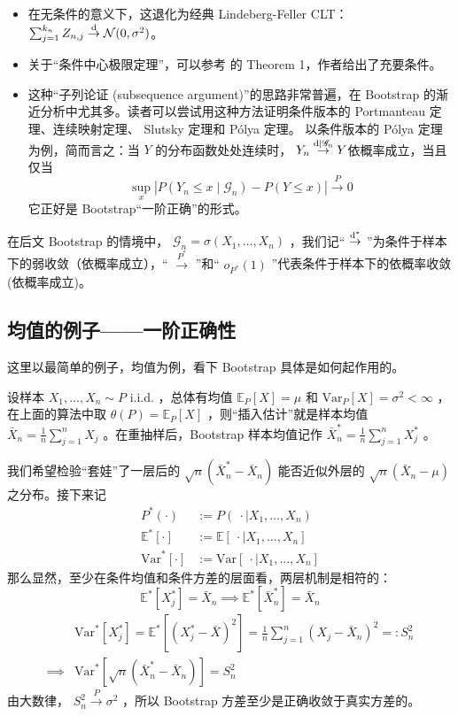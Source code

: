\begin{remark}

\begin{itemize}
\tightlist
\item
  在无条件的意义下，这退化为经典 Lindeberg-Feller CLT： $\sum_{j=1}^{k_n} Z_{n,j} \overset{\rm d}\to \mathcal{N}(0, \sigma^2)$。
\item
  关于``条件中心极限定理''，可以参考 \cite{bulinski2016} 的 Theorem 1，作者给出了充要条件。
\item
  这种``子列论证 (subsequence argument)''的思路非常普遍，在 Bootstrap 的渐近分析中尤其多。读者可以尝试用这种方法证明条件版本的 Portmanteau 定理、连续映射定理、 Slutsky 定理和 Pólya 定理。 以条件版本的 Pólya 定理为例，简而言之：当 $Y$ 的分布函数处处连续时， $Y_n\overset{\rm d|\mathscr G_n}\to Y$依概率成立，当且仅当 
  $$\sup_x|P(Y_n\le x\mid \mathscr G_n)-P(Y\le x)|\overset P\to 0$$ 
  它正好是 Bootstrap``一阶正确''的形式。
\end{itemize}
\end{remark}

在后文 Bootstrap 的情境中， $\mathscr G_n=\sigma(X_1,\dots,X_n)$ ，我们记`` $\overset{\rm d^*}\to$ ''为条件于样本下的弱收敛（依概率成立），`` $\overset{P^*}\to$ ''和`` $o_{P^*}(1)$ ''代表条件于样本下的依概率收敛 (依概率成立)。

\subsection{均值的例子------一阶正确性}

这里以最简单的例子，均值为例，看下 Bootstrap 具体是如何起作用的。

设样本 $X_1,\dots,X_n\sim P$ i.i.d. ，总体有均值 $\mathbb E_P[X]=\mu$ 和 $\mathrm{Var}_P[X]=\sigma^2<\infty$ ，在上面的算法中取 $\theta(P)=\mathbb E_P[X]$ ，则``插入估计''就是样本均值 $\textstyle \bar{X}_n=\frac{1}{n}\sum_{j=1}^nX_j$ 。在重抽样后，Bootstrap 样本均值记作 $\textstyle \bar{X}_n^*=\frac{1}{n}\sum_{j=1}^nX_j^*$ 。

我们希望检验``套娃''了一层后的 $\sqrt{n}(\bar{X}_n^*-\bar{X}_n)$ 能否近似外层的 $\sqrt{n}(\bar{X}_n-\mu)$ 之分布。接下来记
\[\begin{aligned} P^*(\cdot)&:=P(\ \cdot\mid X_1,\dots,X_n)\\ \mathbb{E}^*[\cdot] &:= \mathbb{E}[\ \cdot\mid X_1,\dots,X_n] \\ \mathrm{Var}^*[\cdot] &:=\mathrm{Var}[\ \cdot\mid X_1,\dots,X_n] \end{aligned}\]
那么显然，至少在条件均值和条件方差的层面看，两层机制是相符的：
\[\mathbb{E}^*[X_j^*]=\bar{X}_n \implies \mathbb{E}^*[\bar{X}_n^*]=\bar{X}_n\]\[\begin{aligned} & \mathrm{Var}^*[X_j^*]=\mathbb E^*[(X_j^*-\bar{X})^2]=\frac{1}{n}\sum_{j=1}^n(X_j-\bar{X}_n)^2 =:S^2_n\\ \implies & \mathrm{Var}^*\!\left[\sqrt{n}(\bar{X}_n^*-\bar{X}_n)\right] =S^2_n \end{aligned}\]
由大数律， $S^2_n\overset{P}\to \sigma^2$ ，所以 Bootstrap 方差至少是正确收敛于真实方差的。

